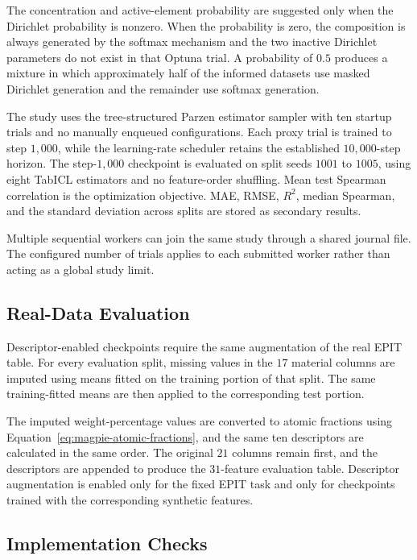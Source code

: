 \documentclass{article}
\begin{document}
The concentration and active-element probability are suggested only when the
Dirichlet probability is nonzero. When the probability is zero, the composition
is always generated by the softmax mechanism and the two inactive Dirichlet
parameters do not exist in that Optuna trial. A probability of \(0.5\) produces
a mixture in which approximately half of the informed datasets use masked
Dirichlet generation and the remainder use softmax generation.

The study uses the tree-structured Parzen estimator sampler with ten startup
trials and no manually enqueued configurations. Each proxy trial is trained to
step \(1{,}000\), while the learning-rate scheduler retains the established
\(10{,}000\)-step horizon. The step-\(1{,}000\) checkpoint is evaluated on split
seeds \(1001\) to \(1005\), using eight TabICL estimators and no feature-order
shuffling. Mean test Spearman correlation is the optimization objective. MAE,
RMSE, \(R^2\), median Spearman, and the standard deviation across splits are
stored as secondary results.

Multiple sequential workers can join the same study through a shared journal
file. The configured number of trials applies to each submitted worker rather
than acting as a global study limit.

\subsection{Real-Data Evaluation}

Descriptor-enabled checkpoints require the same augmentation of the real EPIT
table. For every evaluation split, missing values in the \(17\) material columns
are imputed using means fitted on the training portion of that split. The same
training-fitted means are then applied to the corresponding test portion.

The imputed weight-percentage values are converted to atomic fractions using
Equation~\eqref{eq:magpie-atomic-fractions}, and the same ten descriptors are
calculated in the same order. The original \(21\) columns remain first, and the
descriptors are appended to produce the \(31\)-feature evaluation table.
Descriptor augmentation is enabled only for the fixed EPIT task and only for
checkpoints trained with the corresponding synthetic features.

\subsection{Implementation Checks}
\end{document}
